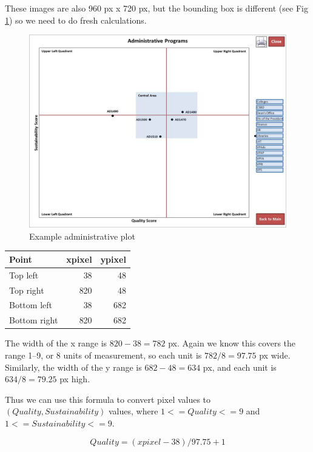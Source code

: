 \documentclass[article,10pt,microtype]{article}
\begin{document}
These images are also 960 px x 720 px, but the bounding box is different (see Fig \ref{fig:administrative}) so we need to do fresh calculations.

\begin{figure}[htb]
\centering
\includegraphics[width=.9\linewidth]{FspAdministrativeLibraries.JPG}
\caption{\label{fig:administrative}Example administrative plot}
\end{figure}

\begin{center}
\begin{tabular}{lrr}
Point & xpixel & ypixel\\
\hline
Top left & 38 & 48\\
Top right & 820 & 48\\
Bottom left & 38 & 682\\
Bottom right & 820 & 682\\
\end{tabular}
\end{center}

The width of the x range is \(820 - 38 = 782\) px.  Again we know this covers the range 1--9, or 8 units of measurement, so each unit is \( 782 / 8 = 97.75\) px wide.  Similarly, the width of the y range is \(682 - 48 = 634\) px, and each unit is \(634 / 8 = 79.25 \) px high.

Thus we can use this formula to convert pixel values to \((Quality, Sustainability)\) values, where \( 1 <= Quality <= 9\) and \(1 <= Sustainability <= 9\).

\begin{equation}
Quality = (xpixel - 38)/97.75 + 1
\end{equation}
\end{document}
